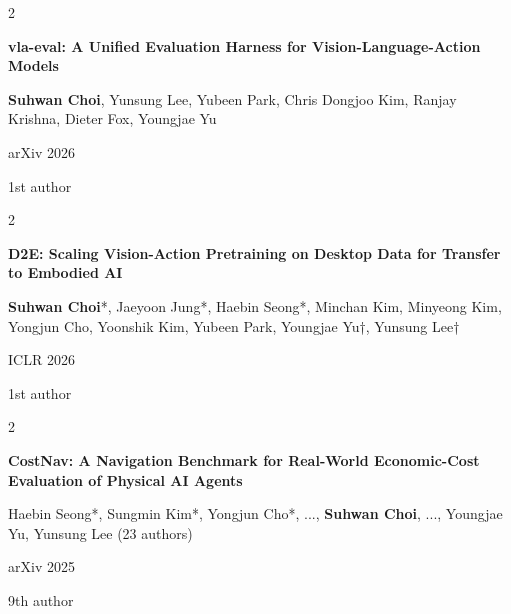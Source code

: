 \documentclass[10pt, letterpaper]{article}
\newenvironment{pubentry}[2][]{
    \onecolentry
    \def\secondColumn{#2}
    \setcolumnwidth{\fill, 2 cm}
    \begin{paracol}{2}
}{
    \switchcolumn \raggedleft \secondColumn
    \end{paracol}
    \endonecolentry
} %
\let\hrefWithoutArrow\href
\renewcommand{\href}[2]{\hrefWithoutArrow{#1}{\ifthenelse{\equal{#2}{}}{ }{#2 }\raisebox{.15ex}{\footnotesize \faExternalLink*}}}
\begin{document}

\begin{samepage}
    \begin{pubentry}{
            1st author
        }
        \textbf{vla-eval: A Unified Evaluation Harness for Vision-Language-Action Models} \href{https://github.com/allenai/vla-evaluation-harness}{[Code]}
        
        \vspace{0.10 cm}
        
        \small \textbf{Suhwan Choi}, Yunsung Lee, Yubeen Park, Chris Dongjoo Kim, Ranjay Krishna, Dieter Fox, Youngjae Yu
        
        \vspace{0.10 cm}
        
        arXiv 2026
    \end{pubentry}
\end{samepage}

\vspace{0.2 cm}

\begin{samepage}
    \begin{pubentry}{
            1st author
        }
        \textbf{D2E: Scaling Vision-Action Pretraining on Desktop Data for Transfer to Embodied AI} \href{https://worv-ai.github.io/d2e/}{[Website]}
        
        \vspace{0.10 cm}
        
        \small \textbf{Suhwan Choi}*, Jaeyoon Jung*, Haebin Seong*, Minchan Kim, Minyeong Kim, Yongjun Cho, Yoonshik Kim, Yubeen Park, Youngjae Yu†, Yunsung Lee†
        
        \vspace{0.10 cm}
        
        ICLR 2026
    \end{pubentry}
\end{samepage}

\vspace{0.2 cm}

\begin{samepage}
    \begin{pubentry}{
            9th author
        }
        \textbf{CostNav: A Navigation Benchmark for Real-World Economic-Cost Evaluation of Physical AI Agents} \href{https://worv-ai.github.io/costnav/}{[Website]}
        
        \vspace{0.10 cm}
        
        \small Haebin Seong*, Sungmin Kim*, Yongjun Cho*, ..., \textbf{Suhwan Choi}, ..., Youngjae Yu, Yunsung Lee (23 authors)
        
        \vspace{0.10 cm}
        
        arXiv 2025
    \end{pubentry}
\end{samepage}
\end{document}
